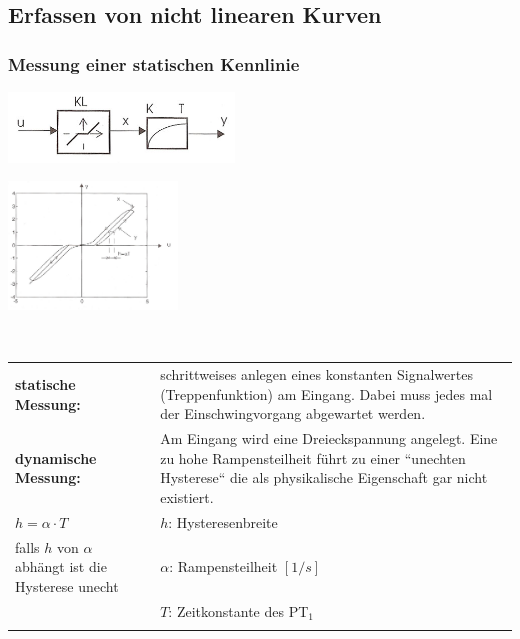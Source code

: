 \newpage
	
\subsection{Erfassen von nicht linearen Kurven}
	\subsubsection{Messung einer statischen Kennlinie }
	\begin{minipage}{10cm}
		\includegraphics[width=6cm]{./bilder/NichtlinearMitPT1.jpg}   
    \end{minipage}
	\begin{minipage}{7cm}
    	\includegraphics[width=4.5cm]{./bilder/NichtlinearMitPT1_dia.jpg}
    \end{minipage}\\
		\begin{tabular}{p{4cm}  p{14cm}}
				\textbf{statische Messung:} &
				schrittweises anlegen eines konstanten Signalwertes (Treppenfunktion)
				am Eingang. Dabei muss jedes mal der Einschwingvorgang abgewartet werden.\\
				
				\textbf{dynamische Messung:} &
				Am Eingang wird eine Dreieckspannung angelegt. Eine zu hohe Rampensteilheit
				führt zu einer ``unechten Hysterese`` die als physikalische Eigenschaft gar
				nicht existiert.\\
		
				$h = \alpha \cdot T$ & $h$: Hysteresenbreite\\
				\parbox{4cm}{falls $h$ von $\alpha$ abhängt ist die Hysterese unecht} & $\alpha$: Rampensteilheit $[1/s]$\\
				& $T$: Zeitkonstante des PT$_1$\\
				& 
			
		\end{tabular}



